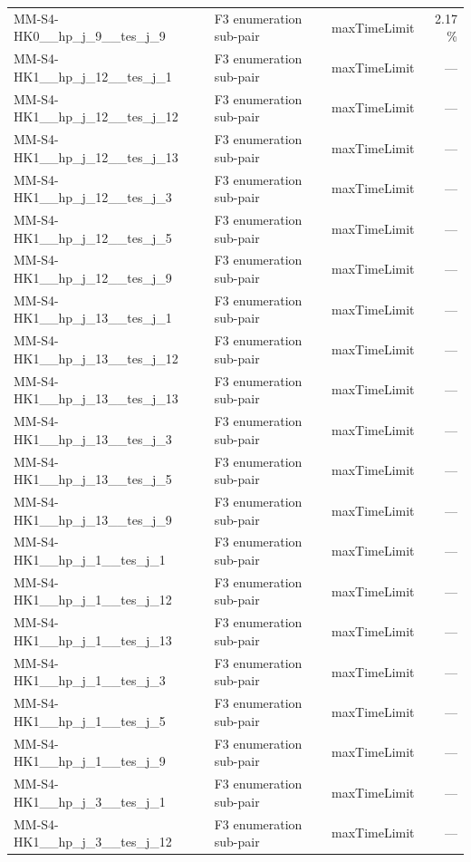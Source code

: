 \begin{table}[htbp]
\begin{tabular}{lllr}
  MM-S4-HK0\_\_hp\_j\_9\_\_tes\_j\_9 & F3 enumeration sub-pair & maxTimeLimit & 2.17 \% \\
  MM-S4-HK1\_\_hp\_j\_12\_\_tes\_j\_1 & F3 enumeration sub-pair & maxTimeLimit & — \\
  MM-S4-HK1\_\_hp\_j\_12\_\_tes\_j\_12 & F3 enumeration sub-pair & maxTimeLimit & — \\
  MM-S4-HK1\_\_hp\_j\_12\_\_tes\_j\_13 & F3 enumeration sub-pair & maxTimeLimit & — \\
  MM-S4-HK1\_\_hp\_j\_12\_\_tes\_j\_3 & F3 enumeration sub-pair & maxTimeLimit & — \\
  MM-S4-HK1\_\_hp\_j\_12\_\_tes\_j\_5 & F3 enumeration sub-pair & maxTimeLimit & — \\
  MM-S4-HK1\_\_hp\_j\_12\_\_tes\_j\_9 & F3 enumeration sub-pair & maxTimeLimit & — \\
  MM-S4-HK1\_\_hp\_j\_13\_\_tes\_j\_1 & F3 enumeration sub-pair & maxTimeLimit & — \\
  MM-S4-HK1\_\_hp\_j\_13\_\_tes\_j\_12 & F3 enumeration sub-pair & maxTimeLimit & — \\
  MM-S4-HK1\_\_hp\_j\_13\_\_tes\_j\_13 & F3 enumeration sub-pair & maxTimeLimit & — \\
  MM-S4-HK1\_\_hp\_j\_13\_\_tes\_j\_3 & F3 enumeration sub-pair & maxTimeLimit & — \\
  MM-S4-HK1\_\_hp\_j\_13\_\_tes\_j\_5 & F3 enumeration sub-pair & maxTimeLimit & — \\
  MM-S4-HK1\_\_hp\_j\_13\_\_tes\_j\_9 & F3 enumeration sub-pair & maxTimeLimit & — \\
  MM-S4-HK1\_\_hp\_j\_1\_\_tes\_j\_1 & F3 enumeration sub-pair & maxTimeLimit & — \\
  MM-S4-HK1\_\_hp\_j\_1\_\_tes\_j\_12 & F3 enumeration sub-pair & maxTimeLimit & — \\
  MM-S4-HK1\_\_hp\_j\_1\_\_tes\_j\_13 & F3 enumeration sub-pair & maxTimeLimit & — \\
  MM-S4-HK1\_\_hp\_j\_1\_\_tes\_j\_3 & F3 enumeration sub-pair & maxTimeLimit & — \\
  MM-S4-HK1\_\_hp\_j\_1\_\_tes\_j\_5 & F3 enumeration sub-pair & maxTimeLimit & — \\
  MM-S4-HK1\_\_hp\_j\_1\_\_tes\_j\_9 & F3 enumeration sub-pair & maxTimeLimit & — \\
  MM-S4-HK1\_\_hp\_j\_3\_\_tes\_j\_1 & F3 enumeration sub-pair & maxTimeLimit & — \\
  MM-S4-HK1\_\_hp\_j\_3\_\_tes\_j\_12 & F3 enumeration sub-pair & maxTimeLimit & — \\

\end{tabular}
\end{table}
